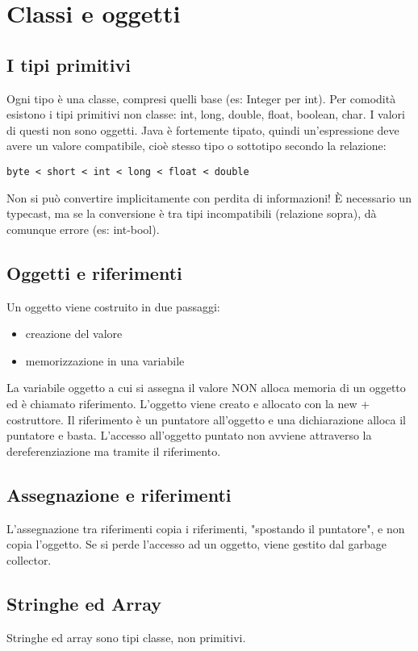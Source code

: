 \chapter{Classi e oggetti}

\section{I tipi primitivi}
Ogni tipo è una classe, compresi quelli base (es: Integer per int). 
Per comodità esistono i tipi primitivi non classe: int, long, double, float, boolean, char. I valori di questi non sono oggetti. 
Java è fortemente tipato, quindi un'espressione deve avere un valore compatibile, cioè stesso tipo o sottotipo secondo la relazione:
\begin{verbatim}
byte < short < int < long < float < double 
\end{verbatim} 
Non si può convertire implicitamente con perdita di informazioni! È necessario un typecast, ma se la conversione è tra tipi incompatibili (relazione sopra), dà comunque errore (es: int-bool).

\section{Oggetti e riferimenti}
Un oggetto viene costruito in due passaggi:
\begin{itemize}
\item creazione del valore
\item memorizzazione in una variabile
\end{itemize}

La variabile oggetto a cui si assegna il valore NON alloca memoria di un oggetto ed è chiamato riferimento.
L'oggetto viene creato e allocato con la new + costruttore.
Il riferimento è un puntatore all'oggetto e una dichiarazione alloca il puntatore e basta. L'accesso all'oggetto puntato non avviene attraverso la dereferenziazione ma tramite il riferimento.

\section{Assegnazione e riferimenti}
L'assegnazione tra riferimenti copia i riferimenti, "spostando il puntatore", e non copia l'oggetto. Se si perde l'accesso ad un oggetto, viene gestito dal garbage collector.

\section{Stringhe ed Array}
Stringhe ed array sono tipi classe, non primitivi.

